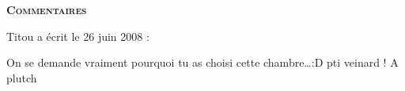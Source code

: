 \bigskip
\textbf{\textsc{Commentaires}}

\medskip
Titou a écrit le 26 juin 2008 :
\begin{displayquote}
On se demande vraiment pourquoi tu as choisi cette chambre\dots :D pti veinard !
A plutch
\end{displayquote}

\vfill
